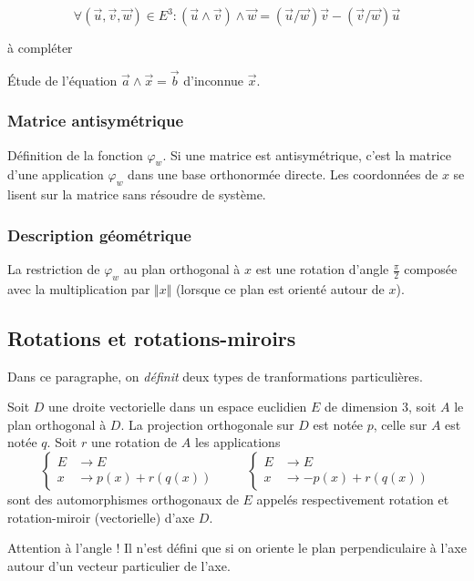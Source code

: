 \clearpage
{}
\begin{propn}
 \begin{displaymath}
 \forall(\overrightarrow u, \overrightarrow v, \overrightarrow w)\in E^3 : 
(\overrightarrow u \wedge \overrightarrow v ) \wedge \overrightarrow w
= (\overrightarrow u / \overrightarrow w )\overrightarrow v 
- (\overrightarrow v / \overrightarrow w )\overrightarrow u
\end{displaymath}
\end{propn}
\begin{demo}
 à compléter
\end{demo}
\'Etude de l'équation $\overrightarrow a \wedge \overrightarrow x =\overrightarrow b$ d'inconnue $\overrightarrow x$.

\subsubsection{Matrice antisymétrique}
Définition de la fonction $\varphi_w$.
Si une matrice est antisymétrique, c'est la matrice d'une application $\varphi_w$ dans une base orthonormée directe. Les coordonnées de $x$ se lisent sur la matrice sans résoudre de système.
\subsubsection{Description géométrique}
La restriction de $\varphi_w$ au plan orthogonal à $x$ est une rotation d'angle $\frac{\pi}{2}$ composée avec la multiplication par $\Vert x\Vert$ (lorsque ce plan est orienté autour de $x$).
\subsection{Rotations et rotations-miroirs}
Dans ce paragraphe, on \emph{définit} deux types de tranformations particulières. 
\begin{propn}
 Soit $D$ une droite vectorielle dans un espace euclidien $E$ de dimension $3$, soit $A$ le plan orthogonal à $D$. La projection orthogonale sur $D$ est notée $p$, celle sur $A$ est notée $q$. Soit $r$ une rotation de $A$ les applications
\begin{displaymath}
 \left\lbrace 
\begin{aligned}
 E &\rightarrow E\\
 x &\rightarrow p(x)+r(q(x))
\end{aligned}
\right. 
\hspace{1cm}
 \left\lbrace 
\begin{aligned}
 E &\rightarrow E\\
 x &\rightarrow -p(x)+r(q(x))
\end{aligned}
\right. 
\end{displaymath}
sont des automorphismes orthogonaux de $E$ appelés respectivement rotation et rotation-miroir (vectorielle) d'axe $D$.
\end{propn}
Attention à l'angle ! Il n'est défini que si on oriente le plan perpendiculaire à l'axe autour d'un vecteur particulier de l'axe.

